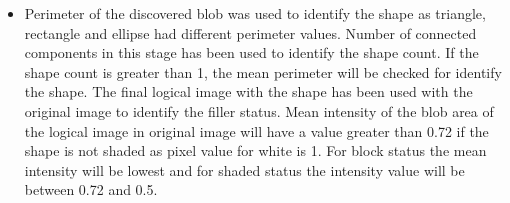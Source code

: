 \begin{itemize}
	\item Perimeter of the discovered blob was used to identify the shape as triangle, rectangle and ellipse had different perimeter values. Number of connected components in this stage has been used to identify the shape count. If the shape count is greater than 1, the mean perimeter will be checked for identify the shape. The final logical image with the shape has been used with the original image to identify the filler status. Mean intensity of the blob area of the logical image in original image will have a value greater than 0.72 if the shape is not shaded as pixel value for white is 1. For block status the mean intensity will be lowest and for shaded status the intensity value will be between 0.72 and 0.5.
	
	
\end{itemize}
	
